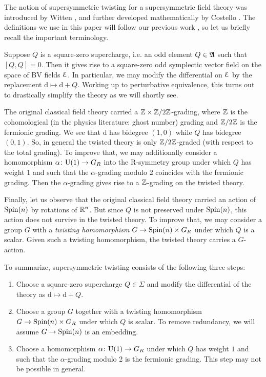 \documentclass[10pt, oneside]{article}
\begin{document}
The notion of supersymmetric twisting for a supersymmetric field theory was introduced by Witten \cite{WittenTQFT}, and further developed mathematically by Costello \cite{CostelloSUSY}. 
The definitions we use in this paper will follow our previous work \cite{ElliottSafronov}, so let us briefly recall the important terminology.

Suppose $Q$ is a square-zero supercharge, i.e. an odd element $Q\in\mathfrak A$ such that $[Q, Q]=0$. Then it gives rise to a square-zero odd symplectic vector field on the space of BV fields $\mathcal E$. In particular, we may modify the differential on $\mathcal E$ by the replacement $\mathrm{d}\mapsto \mathrm{d}+Q$. Working up to perturbative equivalence, this turns out to drastically simplify the theory as we will shortly see.

The original classical field theory carried a $\mathbb Z\times\mathbb Z/2\mathbb Z$-grading, where $\mathbb Z$ is the cohomological (in the physics literature: ghost number) grading and $\mathbb Z/2\mathbb Z$ is the fermionic grading. We see that $\mathrm{d}$ has bidegree $(1, 0)$ while $Q$ has bidegree $(0, 1)$. So, in general the twisted theory is only $\mathbb Z/2\mathbb Z$-graded (with respect to the total grading). To improve that, we may additionally consider a homomorphism $\alpha\colon \mathrm{U}(1)\rightarrow G_R$ into the R-symmetry group under which $Q$ has weight $1$ and such that the $\alpha$-grading modulo 2 coincides with the fermionic grading. Then the $\alpha$-grading gives rise to a $\mathbb Z$-grading on the twisted theory.

Finally, let us observe that the original classical field theory carried an action of $\mathrm{Spin}(n)$ by rotations of $\mathbb R^n$. But since $Q$ is not preserved under $\mathrm{Spin}(n)$, this action does not survive in the twisted theory. To improve that, we may consider a group $G$ with a \emph{twisting homomorphism} $G\rightarrow \mathrm{Spin}(n)\times G_R$ under which $Q$ is a scalar. Given such a twisting homomorphism, the twisted theory carries a $G$-action.

To summarize, supersymmetric twisting consists of the following three steps:


\begin{enumerate}
\item Choose a square-zero supercharge $Q\in\Sigma$ and modify the differential of the theory as $\mathrm{d}\mapsto\mathrm{d}+Q$.

\item Choose a group $G$ together with a twisting homomorphism $G\rightarrow \mathrm{Spin}(n)\times G_R$ under which $Q$ is scalar. To remove redundancy, we will assume $G\rightarrow \mathrm{Spin}(n)$ is an embedding.

\item Choose a homomorphism $\alpha\colon \mathrm{U}(1)\rightarrow G_R$ under which $Q$ has weight $1$ and such that the $\alpha$-grading modulo 2 is the fermionic grading. This step may not be possible in general.
\end{enumerate}
\end{document}
